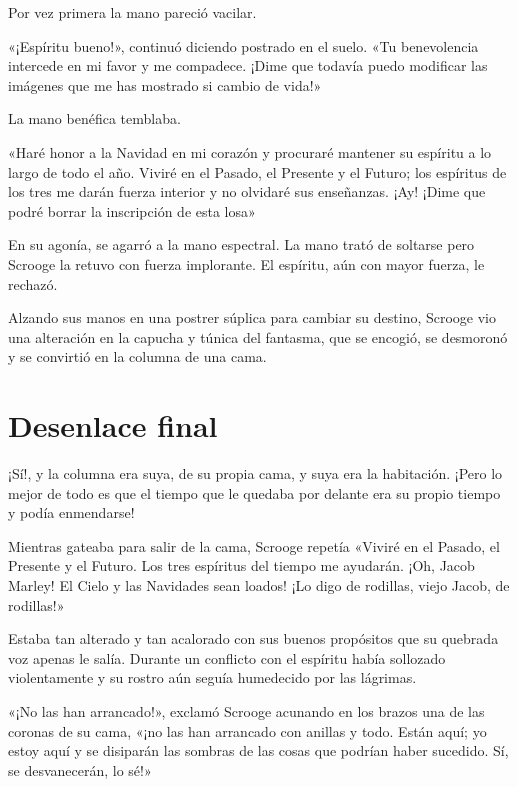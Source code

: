 \documentclass{novela}
\begin{document}
 Por vez primera la mano pareció vacilar.

 «¡Espíritu bueno!», continuó diciendo postrado en el suelo. «Tu benevolencia intercede en mi favor y me compadece. ¡Dime que todavía puedo modificar las imágenes que me has mostrado si cambio de vida!»

 La mano benéfica temblaba.

 «Haré honor a la Navidad en mi corazón y procuraré mantener su espíritu a lo largo de todo el año. Viviré en el Pasado, el Presente y el Futuro; los espíritus de los tres me darán fuerza interior y no olvidaré sus enseñanzas. ¡Ay! ¡Dime que podré borrar la inscripción de esta losa»

 En su agonía, se agarró a la mano espectral. La mano trató de soltarse pero Scrooge la retuvo con fuerza implorante. El espíritu, aún con mayor fuerza, le rechazó.

 Alzando sus manos en una postrer súplica para cambiar su destino, Scrooge vio una alteración en la capucha y túnica del fantasma, que se encogió, se desmoronó y se convirtió en la columna de una cama.






 \chapter{Desenlace final}



 ¡Sí!, y la columna era suya, de su propia cama, y suya era la habitación. ¡Pero lo mejor de todo es que el tiempo que le quedaba por delante era su propio tiempo y podía enmendarse!

 Mientras gateaba para salir de la cama, Scrooge repetía «Viviré en el Pasado, el Presente y el Futuro. Los tres espíritus del tiempo me ayudarán. ¡Oh, Jacob Marley! El Cielo y las Navidades sean loados! ¡Lo digo de rodillas, viejo Jacob, de rodillas!»

 Estaba tan alterado y tan acalorado con sus buenos propósitos que su quebrada voz apenas le salía. Durante un conflicto con el espíritu había sollozado violentamente y su rostro aún seguía humedecido por las lágrimas.

 «¡No las han arrancado!», exclamó Scrooge acunando en los brazos una de las coronas de su cama, «¡no las han arrancado con anillas y todo. Están aquí; yo estoy aquí y se disiparán las sombras de las cosas que podrían haber sucedido. Sí, se desvanecerán, lo sé!»
\end{document}
